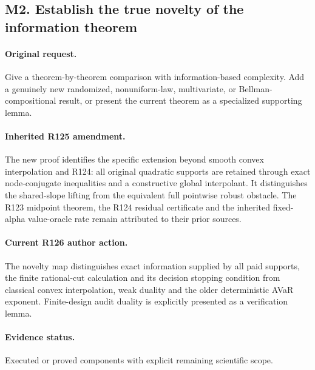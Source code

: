\subsection*{M2. Establish the true novelty of the information theorem}
\paragraph{Original request.} Give a theorem-by-theorem comparison with information-based complexity. Add a genuinely new randomized, nonuniform-law, multivariate, or Bellman-compositional result, or present the current theorem as a specialized supporting lemma.

\paragraph{Inherited R125 amendment.} The new proof identifies the specific extension beyond smooth convex interpolation and R124: all original quadratic supports are retained through exact node-conjugate inequalities and a constructive global interpolant. It distinguishes the shared-slope lifting from the equivalent full pointwise robust obstacle. The R123 midpoint theorem, the R124 residual certificate and the inherited fixed-alpha value-oracle rate remain attributed to their prior sources.

\paragraph{Current R126 author action.} The novelty map distinguishes exact information supplied by all paid supports, the finite rational-cut calculation and its decision stopping condition from classical convex interpolation, weak duality and the older deterministic AVaR exponent. Finite-design audit duality is explicitly presented as a verification lemma.

\paragraph{Evidence status.} Executed or proved components with explicit remaining scientific scope.

